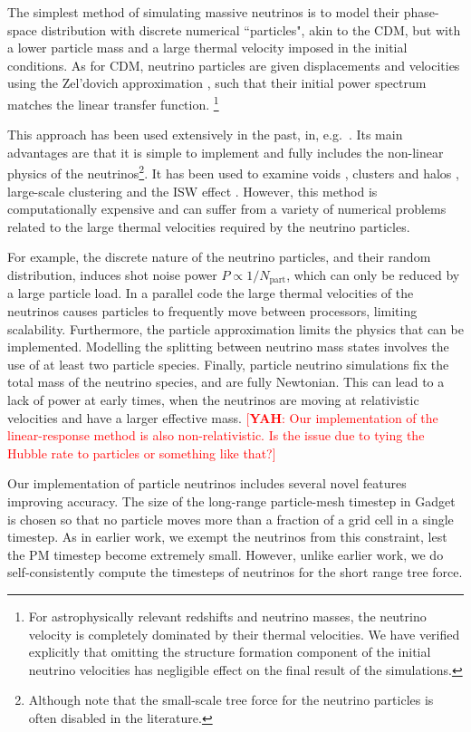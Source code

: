 \documentclass[useAMS, usenatbib]{mnras}
\newcommand{\yah}[1]{{\textcolor{red}{[{\bf YAH}: #1]}}}
\begin{document}
The simplest method of simulating massive neutrinos is to model their phase-space distribution with discrete numerical ``particles", akin to the CDM, but with a lower particle mass and a large thermal velocity imposed
in the initial conditions. As for CDM, neutrino particles are given displacements and velocities using the Zel'dovich approximation \citep{Zeldovich_1970}, such that their initial power spectrum matches the linear transfer function. \footnote{For astrophysically relevant redshifts and neutrino masses, the neutrino velocity is completely dominated by their thermal velocities. We have verified explicitly that omitting the structure formation component of the initial neutrino velocities has negligible effect on the final result of the simulations.}

This approach has been used extensively in the past, in, e.g.~\cite{Brandbyge_2008, Bird_2012, Inman_2017, FVN_2017}. Its main advantages are that it is simple to implement and fully includes the non-linear physics of the
neutrinos\footnote{Although note that the small-scale tree force for the neutrino particles is often disabled in the literature.}. It has been used to examine voids \citep{Massara_2015}, clusters and halos \citep{FVN_2014, Castorina_2014, Costanzi_2013}, large-scale clustering \citep{Castorina_2015} and the ISW effect \citep{Carbone_2016}.
However, this method is computationally expensive and can suffer from a variety of numerical problems related to the large thermal velocities required by the neutrino particles.

For example, the discrete nature of the neutrino particles, and their random distribution, induces shot noise power $P \propto 1/N_\mathrm{part}$, which can only be reduced by a large particle load. In a parallel code the large thermal velocities of the neutrinos causes particles to frequently move between processors, limiting scalability. Furthermore, the particle approximation limits the physics that can be implemented. Modelling the splitting between neutrino mass states involves the use of at least two particle species. Finally, particle neutrino simulations fix the total mass of the neutrino species, and are fully Newtonian. This can lead to a lack of power at early times, when the neutrinos are moving at relativistic velocities and have a larger effective mass. \yah{Our implementation of the linear-response method is also non-relativistic. Is the issue due to tying the Hubble rate to particles or something like that?}

Our implementation of particle neutrinos includes several novel features improving accuracy. The size of the long-range particle-mesh timestep in Gadget is chosen so that no particle moves more than a fraction of a grid cell in a single timestep. As in earlier work, we exempt the neutrinos from this constraint, lest the PM timestep become extremely small. However, unlike earlier work, we do self-consistently compute the timesteps of neutrinos for the short range tree force.
\end{document}
